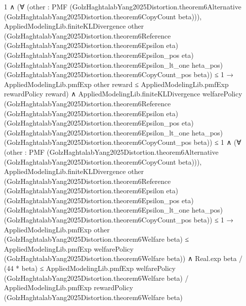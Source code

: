 \documentclass[10pt]{article}
\begin{document}
\begin{ReviewVerbatim}
                      1 ∧
                    (∀
                        (other :
                          PMF
                            (GolzHaghtalabYang2025Distortion.theorem6Alternative
                              (GolzHaghtalabYang2025Distortion.theorem6CopyCount beta))),
                        AppliedModelingLib.finiteKLDivergence other
                              (GolzHaghtalabYang2025Distortion.theorem6Reference
                                (GolzHaghtalabYang2025Distortion.theorem6Epsilon eta)
                                (GolzHaghtalabYang2025Distortion.theorem6Epsilon_pos eta)
                                (GolzHaghtalabYang2025Distortion.theorem6Epsilon_lt_one heta_pos)
                                (GolzHaghtalabYang2025Distortion.theorem6CopyCount_pos beta)) ≤
                            1 →
                          AppliedModelingLib.pmfExp other reward ≤ AppliedModelingLib.pmfExp rewardPolicy reward) ∧
                      AppliedModelingLib.finiteKLDivergence welfarePolicy
                            (GolzHaghtalabYang2025Distortion.theorem6Reference
                              (GolzHaghtalabYang2025Distortion.theorem6Epsilon eta)
                              (GolzHaghtalabYang2025Distortion.theorem6Epsilon_pos eta)
                              (GolzHaghtalabYang2025Distortion.theorem6Epsilon_lt_one heta_pos)
                              (GolzHaghtalabYang2025Distortion.theorem6CopyCount_pos beta)) ≤
                          1 ∧
                        (∀
                            (other :
                              PMF
                                (GolzHaghtalabYang2025Distortion.theorem6Alternative
                                  (GolzHaghtalabYang2025Distortion.theorem6CopyCount beta))),
                            AppliedModelingLib.finiteKLDivergence other
                                  (GolzHaghtalabYang2025Distortion.theorem6Reference
                                    (GolzHaghtalabYang2025Distortion.theorem6Epsilon eta)
                                    (GolzHaghtalabYang2025Distortion.theorem6Epsilon_pos eta)
                                    (GolzHaghtalabYang2025Distortion.theorem6Epsilon_lt_one heta_pos)
                                    (GolzHaghtalabYang2025Distortion.theorem6CopyCount_pos beta)) ≤
                                1 →
                              AppliedModelingLib.pmfExp other (GolzHaghtalabYang2025Distortion.theorem6Welfare beta) ≤
                                AppliedModelingLib.pmfExp welfarePolicy
                                  (GolzHaghtalabYang2025Distortion.theorem6Welfare beta)) ∧
                          Real.exp beta / (44 * beta) ≤
                            AppliedModelingLib.pmfExp welfarePolicy
                                (GolzHaghtalabYang2025Distortion.theorem6Welfare beta) /
                              AppliedModelingLib.pmfExp rewardPolicy
                                (GolzHaghtalabYang2025Distortion.theorem6Welfare beta)
\end{ReviewVerbatim}
\end{document}
